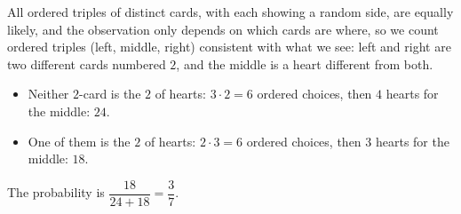 All ordered triples of distinct cards, with each showing a random side, are equally likely, and the observation only depends on which cards are where, so we count ordered triples (left, middle, right) consistent with what we see: left and right are two different cards numbered $2$, and the middle is a heart different from both.
\begin{itemize}
\item Neither $2$-card is the $2$ of hearts: $3\cdot2=6$ ordered choices, then $4$ hearts for the middle: $24$.
\item One of them is the $2$ of hearts: $2\cdot3=6$ ordered choices, then $3$ hearts for the middle: $18$.
\end{itemize}
The probability is $\dfrac{18}{24+18}=\boxed{\dfrac{3}{7}}$.
